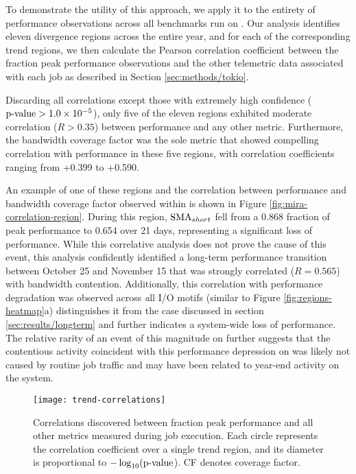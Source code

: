 To demonstrate the utility of this approach, we apply it to the entirety of performance observations across all benchmarks run on \mira.
Our analysis identifies eleven divergence regions across the entire year, and for each of the corresponding trend regions, we then calculate the Pearson correlation coefficient between the fraction peak performance observations and the other telemetric data associated with each job as described in Section \ref{sec:methods/tokio}.


Discarding all correlations except those with extremely high confidence ($\textup{p-value} > {1.0 \times 10^{-5}}$), only five of the eleven regions exhibited moderate correlation ($R > 0.35$) between performance and any other metric.
Furthermore, the bandwidth coverage factor was the sole metric that showed compelling correlation with performance in these five regions, with correlation coefficients ranging from +0.399 to +0.590. 

An example of one of these regions and the correlation between performance and bandwidth coverage factor observed within is shown in Figure \ref{fig:mira-correlation-region}.
During this region, $\textup{SMA}_{short}$ fell from a 0.868 fraction of peak performance to 0.654 over 21 days, representing a significant loss of performance.
While this correlative analysis does not prove the cause of this event, this analysis confidently identified a long-term performance transition between October 25 and November 15 that was strongly correlated ($R = 0.565$) with bandwidth contention.
Additionally, this correlation with performance degradation was observed across {\emph all} I/O motifs (similar to Figure \ref{fig:regions-heatmap}a) distinguishes it from the case discussed in section \ref{sec:results/longterm} and further indicates a system-wide loss of performance.
The relative rarity of an event of this magnitude on \mira further suggests that the contentious activity coincident with this performance depression on \mira was likely not caused by routine job traffic and may have been related to year-end activity on the system.

\begin{figure}
    \centering
    \texttt{[image: trend-correlations]}
    \vspace{-.35in}
    \caption{Correlations discovered between fraction peak performance and all other metrics measured during job execution.
    Each circle represents the correlation coefficient over a single trend region, and its diameter is proportional to $-\log_{10}(\textup{p-value}$).
    CF denotes coverage factor.}
    \label{fig:trend-correlations}
\end{figure}



